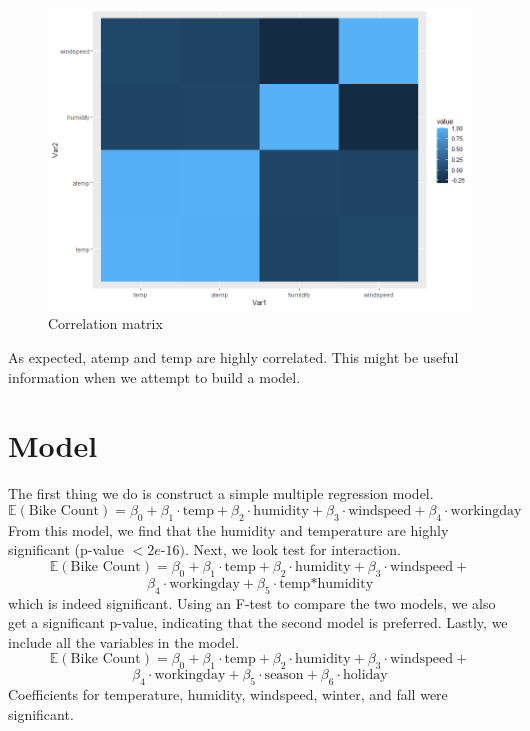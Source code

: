 \documentclass{article}
\begin{document}
\begin{figure}[htp]
    \centering
    \includegraphics[scale = 0.25]{Figures/correlation_matrix.png}
    \caption{Correlation matrix}
    \label{fig:my_label}
\end{figure}
As expected, atemp and temp are highly correlated. This might be useful information when we attempt to build a model.

\section{Model}
The first thing we do is construct a simple multiple regression model. 
$$\mathbb{E}(\text{Bike Count}) = \beta_{0} + \beta_{1} \cdot \text{temp} + \beta_{2} \cdot \text{humidity} + \beta_{3} \cdot \text{windspeed} + \beta_4 \cdot \text{workingday}
$$
From this model, we find that the humidity and temperature are highly significant (p-value $<2e$-$16)$. Next, we look test for interaction.
$$\mathbb{E}(\text{Bike Count}) = \beta_{0} + \beta_{1} \cdot \text{temp} + \beta_{2} \cdot \text{humidity} + \beta_{3} \cdot \text{windspeed}+ $$$$ \beta_4 \cdot \text{workingday} + \beta_5 \cdot \text{temp*humidity}
$$
which is indeed significant. Using an F-test to compare the two models, we also get a significant p-value, indicating that the second model is preferred. Lastly, we include all the variables in the model.
$$\mathbb{E}(\text{Bike Count}) = \beta_{0} + \beta_{1} \cdot \text{temp} + \beta_{2} \cdot \text{humidity} + \beta_{3} \cdot \text{windspeed} +$$$$ \beta_4 \cdot \text{workingday} + \beta_5 \cdot \text{season} + \beta_6 \cdot \text{holiday}
$$
Coefficients for temperature, humidity, windspeed, winter, and fall were significant.\\
\end{document}

